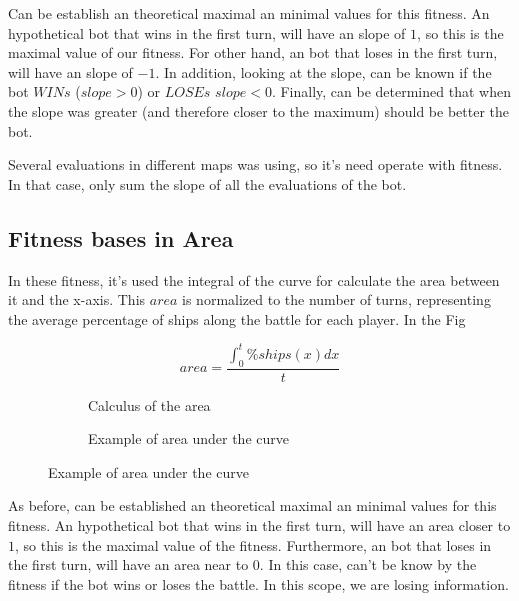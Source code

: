\documentclass{llncs}
\begin{document}
Can be establish an theoretical maximal an minimal values for this fitness. An hypothetical bot that wins in the first turn, will have an slope of {$1$}, so this is the maximal value of our fitness. For other hand, an bot that loses in the first turn, will have an slope of {$-1$}. In addition, looking at the slope, can be known if the bot {$WINs$} ({$slope>0$}) or {$LOSEs$} {$slope<0$}. Finally, can be determined that when the slope was greater (and therefore closer to the maximum) should be better the bot.

Several evaluations in different maps was using, so it's need operate with fitness. In that case, only sum the slope of all the evaluations of the bot.

\subsection{Fitness bases in Area}
\label{sec:fitness}

In these fitness, it's used the integral of the curve for calculate the area between it and the x-axis. This {$area$} is normalized to the number of turns, representing the average percentage of ships along the battle for each player. In the Fig

\begin{figure}[h]
\begin{subfigure}[H]{0.4\textwidth}
    \begin{equation}
        area=\frac{\int_{0}^{t}\%ships(x)dx}{t}
    \end{equation}
    \caption{Calculus of the area}
    \label{equation:LeatsSqueares}
\end{subfigure}
\begin{subfigure}[H]{0.8\textwidth}
\begin{center}
\end{center}
\caption{Example of area under the curve} 
\label{figura:nubecita}
\end{subfigure}
\end{figure}

As before, can be established an theoretical maximal an minimal values for this fitness. An hypothetical bot that wins in the first turn, will have an area closer to {$1$}, so this is the maximal value of the fitness. Furthermore, an bot that loses in the first turn, will have an area near to {$0$}. In this case, can't be know by the fitness if the bot wins or loses the battle. In this scope, we are losing information.
\end{document}
